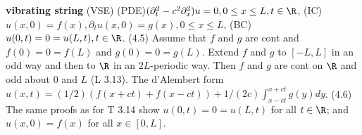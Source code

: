 {\bf vibrating string} (VSE) (PDE)$(\partial_t^2-c^2\partial_x^2)u=0, 0 \leq x \leq L, t \in \R$, (IC) $u(x,0)=f(x), \partial_tu(x,0)=g(x), 0 \leq x \leq L$, (BC) $u(0,t)=0=u(L,t), t \in \R$. (4.5) Assume that $f$ and $g$ are cont and $f(0)=0=f(L)$ and $g(0)=0=g(L)$. Extend $f$ and $g$ to $[-L,L]$ in an odd way and then to $\R$ in an $2L$-periodic way. Then $f$ and $g$ are cont on $\R$ and odd about 0 and $L$ (L 3.13). The d'Alembert form $u(x,t)=(1/2)(f(x+ct)+f(x-ct))+ 1/(2c) \int_{x-ct}^{x+ct}g(y)dy$. (4.6) The same proofs as for T 3.14 show  $u(0,t) = 0 = u(L,t)$ for all $t\in \R$; and $u(x,0)=f(x)$ for all $x \in [0,L]$. 